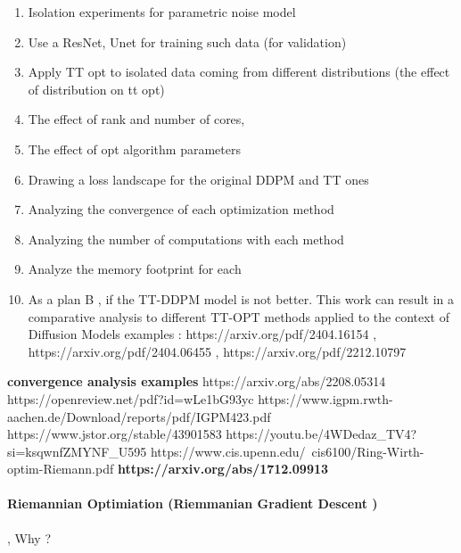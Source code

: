 \documentclass[11pt]{article}
\begin{document}
    \begin{enumerate}
        \item Isolation experiments for parametric noise model
        \item Use a ResNet, Unet for training such data (for validation)
        \item Apply TT opt to isolated data coming from different distributions (the effect of distribution on tt opt)
        \item The effect of rank and number of cores,
        \item The effect of opt algorithm parameters
        \item Drawing a loss landscape for the original DDPM and TT ones
        \item Analyzing the convergence of each optimization method
        \item Analyzing the number of computations with each method
        \item Analyze the memory footprint for each
        \item As a plan B , if the TT-DDPM model is not better.
        This work can result in a comparative analysis to different TT-OPT methods applied to the context of Diffusion Models
        examples : https://arxiv.org/pdf/2404.16154 , https://arxiv.org/pdf/2404.06455 , https://arxiv.org/pdf/2212.10797

    \end{enumerate}
    \textbf{convergence analysis examples}
    https://arxiv.org/abs/2208.05314
    https://openreview.net/pdf?id=wLe1bG93yc
    https://www.igpm.rwth-aachen.de/Download/reports/pdf/IGPM423.pdf
    https://www.jstor.org/stable/43901583
    https://youtu.be/4WDedaz_TV4?si=ksqwnfZMYNF_U595
    https://www.cis.upenn.edu/~cis6100/Ring-Wirth-optim-Riemann.pdf
    \textbf{https://arxiv.org/abs/1712.09913}

    \paragraph{Riemannian Optimiation (Riemmanian Gradient Descent )} , Why ?
\end{document}
